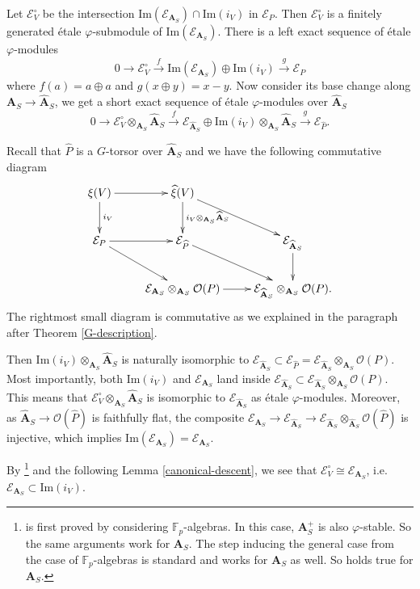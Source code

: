 \documentclass[10pt]{article}
\numberwithin{equation}{section}
\newcommand{\bF}{{\mathbb F}}
\newcommand{\calE}{{\mathcal E}}
\newcommand{\calO}{{\mathcal O}}
\newcommand{\Ima}{{\mathrm{Im}}}            %
\newcommand{\bfA}{{\textbf{A}}}
\begin{document}
Let $\calE^{\circ}_V$ be the intersection $\Ima(\calE_{\bfA_S})\cap \Ima(i_V)$ in $\calE_P$. Then $\calE^{\circ}_V$ is a finitely generated \'etale $\varphi$-submodule of $\Ima(\calE_{\bfA_S})$. There is a left exact sequence of \'etale $\varphi$-modules
\[
0\to \calE^{\circ}_V\xrightarrow{f} \Ima(\calE_{\bfA_S})\oplus \Ima(i_V)\xrightarrow{g} \calE_P
\]
where $f(a)=a\oplus a$ and $g(x\oplus y)=x-y$. Now consider its base change along $\bfA_S\to \widehat\bfA_S$, we get a short exact sequence of \'etale $\varphi$-modules over $\widehat \bfA_S$
\[
0\to \calE^{\circ}_V\otimes_{\bfA_S}\widehat\bfA_S\xrightarrow{f} \calE_{\widehat \bfA_S}\oplus \Ima(i_V)\otimes_{\bfA_S}\widehat\bfA_S\xrightarrow{g} \calE_{\widehat P}.
\]

Recall that $\widehat P$ is a $G$-torsor over $\widehat \bfA_S$ and we have the following commutative diagram
\begin{equation}
    \xymatrix{
   \xi(V)\ar[r]\ar[d]^{i_V}& \widehat \xi(V)\ar[d]^{i_V\otimes_{\bfA_S}\widehat\bfA_S}\ar[dr]&\\
   \calE_P\ar[rd]\ar[r]& \calE_{\widehat P}\ar[rd] & \calE_{\widehat\bfA_S}\ar[d]\\
    & \calE_{\bfA_S}\otimes_{\bfA_S}\calO(P)\ar[r]& \calE_{\widehat\bfA_S}\otimes_{\bfA_S}\calO(P).
    }
\end{equation}
The rightmost small diagram is commutative as we explained in the paragraph after Theorem \ref{G-description}.

Then $\Ima(i_V)\otimes_{\bfA_S}\widehat\bfA_S$ is naturally isomorphic to $\calE_{\widehat\bfA_S}\subset \calE_{\widehat P}=\calE_{\widehat\bfA_S}\otimes_{\bfA_S}\calO(P)$. Most importantly, both $\Ima(i_V)$ and $\calE_{\bfA_S}$ land inside $\calE_{\widehat\bfA_S}\subset \calE_{\widehat\bfA_S}\otimes_{\bfA_S}\calO(P)$. This means that $\calE^{\circ}_V\otimes_{\bfA_S}\widehat \bfA_S$ is isomorphic to $\calE_{\widehat\bfA_S}$ as \'etale $\varphi$-modules. Moreover, as $\widehat \bfA_S\to \calO(\widehat P)$ is faithfully flat, the composite $\calE_{\bfA_S}\to \calE_{\widehat\bfA_S}\to \calE_{\widehat\bfA_S}\otimes_{\widehat\bfA_S}\calO(\widehat P)$ is injective, which implies $\Ima(\calE_{\bfA_S})=\calE_{\bfA_S}$.


By \cite[Theorem 5.5.20]{EG21}\footnote{\cite[Theorem 5.5.20]{EG21} is first proved by considering $\bF_p$-algebras. In this case, $\bfA_S^+$ is also $\varphi$-stable. So the same arguments work for $\bfA_S$. The step inducing the general case from the case of $\bF_p$-algebras is standard and works for $\bfA_S$ as well. So \cite[Theorem 5.5.20]{EG21} holds true for $\bfA_S$.} and the following Lemma \ref{canonical-descent}, we see that $\calE^{\circ}_V\cong \calE_{\bfA_S}$, i.e. $\calE_{\bfA_S}\subset \Ima(i_V)$.
\end{document}
